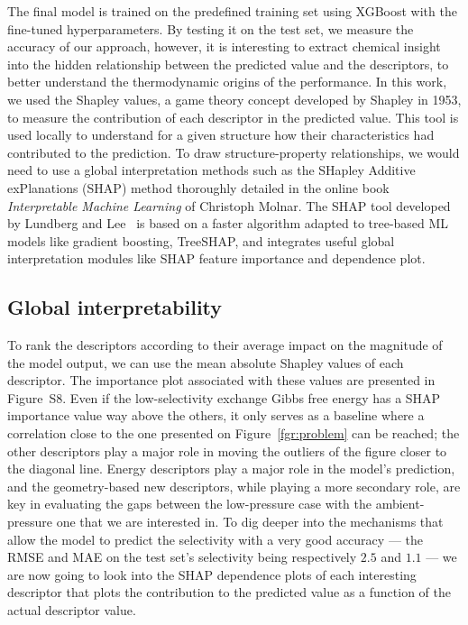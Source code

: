 \documentclass[main]{subfiles}
\begin{document}
The final model is trained on the predefined training set using XGBoost with the fine-tuned hyperparameters. By testing it on the test set, we measure the accuracy of our approach, however, it is interesting to extract chemical insight into the hidden relationship between the predicted value and the descriptors, to better understand the thermodynamic origins of the performance. In this work, we used the Shapley values,\autocite{shapley1953value} a game theory concept developed by Shapley in 1953, to measure the contribution of each descriptor in the predicted value. This tool is used locally to understand for a given structure how their characteristics had contributed to the prediction. To draw structure-property relationships, we would need to use a global interpretation methods such as the SHapley Additive exPlanations (SHAP) method thoroughly detailed in the online book \emph{Interpretable Machine Learning} of Christoph Molnar.\autocite{molnar2020interpretable} The SHAP tool developed by Lundberg and Lee~\autocite{SHAP} is based on a faster algorithm adapted to tree-based ML models like gradient boosting, TreeSHAP, and integrates useful global interpretation modules like SHAP feature importance and dependence plot.

\subsection{Global interpretability}

To rank the descriptors according to their average impact on the magnitude of the model output, we can use the mean absolute Shapley values of each descriptor. The importance plot associated with these values are presented in Figure~S8. Even if the low-selectivity exchange Gibbs free energy has a SHAP importance value way above the others, it only serves as a baseline where a correlation close to the one presented on Figure~\ref{fgr:problem} can be reached; the other descriptors play a major role in moving the outliers of the figure closer to the diagonal line. Energy descriptors play a major role in the model's prediction, and the geometry-based new descriptors, while playing a more secondary role, are key in evaluating the gaps between the low-pressure case with the ambient-pressure one that we are interested in. To dig deeper into the mechanisms that allow the model to predict the selectivity with a very good accuracy --- the RMSE and MAE on the test set's selectivity being respectively $2.5$ and $1.1$ --- we are now going to look into the SHAP dependence plots of each interesting descriptor that plots the contribution to the predicted value as a function of the actual descriptor value.
\end{document}
